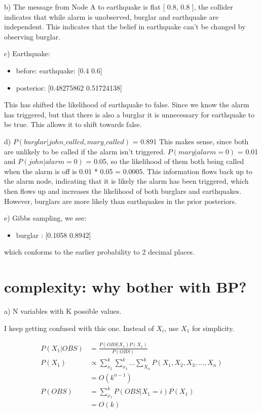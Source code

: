 \documentclass[11pt]{article}
\begin{document}
b) The message from Node A to earthquake is flat [ 0.8, 0.8 ], the collider indicates that while alarm is unobserved, burglar and earthquake are independent. This indicates that the belief in earthquake can't be changed by observing burglar.

c) Earthquake:
\begin{itemize}
	\item before: earthquake: [0.4 0.6]
	\item posterior: [0.48275862 0.51724138]
\end{itemize}

This has shifted the likelihood of earthquake to false. Since we know the alarm has triggered, but that there is also a burglar it is unnecessary for earthquake to be true. This allows it to shift towards false.

d)  ${P(burglar | john\_called, mary\_called)}$ = 0.891
This makes sense, since both are unlikely to be called if the alarm isn't triggered. ${P(mary|alarm=0)}$ = 0.01 and ${P(john|alarm=0)}$ = 0.05, so the likelihood of them both being called when the alarm is off is 0.01 * 0.05 = 0.0005. This information flows back up to the alarm node, indicating that it is likely the alarm has been triggered, which then flows up and increases the likelihood of both burglars and earthquakes. However, burglars are more likely
than earthquakes in the prior posteriors.

e) Gibbs sampling, we see:

\begin{itemize}
	\item burglar     : [0.1058 0.8942]
\end{itemize}

which conforms to the earlier probability to 2 decimal places.

\section{complexity: why bother with BP?}

a) N variables with K possible values.

I keep getting confused with this one. Instead of ${X_i}$, use ${X_1}$ for simplicity.

\begin{align*}
	 P(X_1|OBS) &= \frac{P(OBS|X_1)P(X_1)}{P(OBS)} \\
	 P(X_1) &\propto \sum_{x_2}^{k}\sum_{x_3}^{k}...\sum_{X_n}^{k}P(X_1,X_2,X_3,...,X_n)\\
	  &= O(k^{n-1})\\
	 P(OBS) &= \sum_{x_1}^{k}P(OBS|X_1=i)P(X_1) \\
	 &= O(k)\\
\end{align*}
\end{document}
